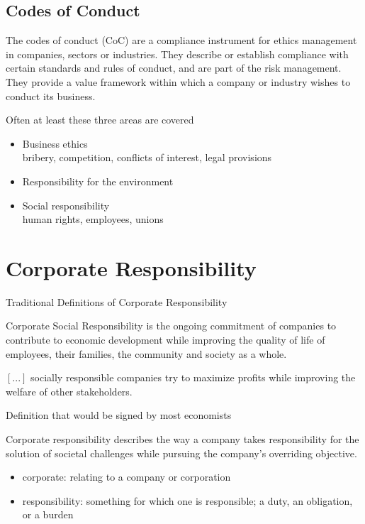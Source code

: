 \documentclass[11pt]{article}
\theoremstyle{definition}
\begin{document}
\subsection{Codes of Conduct}
The codes of conduct (CoC) are a compliance instrument for ethics management in companies, sectors or industries. They describe or establish compliance with certain standards and rules of conduct, and are part of the risk management. They provide a value framework within which a company or industry wishes to conduct its business.

Often at least these three areas are covered
\begin{itemize}
	\item Business ethics\\
	bribery, competition, conflicts of interest, legal provisions
	\item Responsibility for the environment
	\item Social responsibility\\
	human rights, employees, unions
\end{itemize}

\section{Corporate Responsibility}
Traditional Definitions of Corporate Responsibility
\begin{definition}
	Corporate Social Responsibility is the ongoing commitment of companies to contribute to economic development while improving the quality of life of employees, their families, the community and society as a whole.
\end{definition}

\begin{definition}
	$[...]$ socially responsible companies try to maximize profits while improving the welfare of other stakeholders.
\end{definition}

\vspace*{1em}
\noindent
Definition that would be signed by most economists
\begin{definition}
	Corporate responsibility describes the way a company takes responsibility for the solution of societal challenges while pursuing the company’s overriding objective.
	\begin{itemize}
		\item corporate: relating to a company or corporation
		\item responsibility: something for which one is responsible; a duty, an obligation, or a burden
	\end{itemize}
\end{definition}
\end{document}
